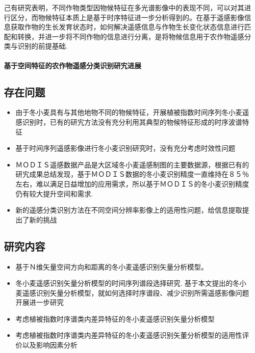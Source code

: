 己有研究表明，不同作物类型因物候特征在多光谱影像中的表现不同，可以对其进行区分，而物候特征本质上是基于时序特征进一步分析得到的。在基于遥感影像信息获取作物的生长发育状态时，如何解决遥感信息与作物生长变化状态信息进行匹配和转换，并进一步将不同作物的信息进行分离，是将物候信息用于农作物遥感分类与识别的前提基础.

\paragraph*{基于空间特征的农作物遥感分类识别研宄进展}


\subsection{存在问题}
\begin{itemize}
    \item 由于冬小麦具有与其他地物不同的物候特征，开展植被指数时间序列冬小麦遥感识别时，已有的研宄方法没有充分利用其典型的物候特征形成的时序波谱特征
    \item 基于时间序列遥感影像进行冬小麦识别研究时，没有充分考虑时效性问题
    \item ＭＯＤＩＳ遥感数据产品是大区域冬小麦遥感制图的主要数据源，根据已有的研宄成果总结发现，基于ＭＯＤＩＳ数据的冬小麦识别精度一直维持在８５％左右，难以满足日益增加的应用需求，所以基于ＭＯＤＩＳ的冬小麦识别精度仍有较大提升空间和需求.
    \item 新的遥感分类识别方法在不同空间分辨率影像上的适用性问题，给信息提取提出了新的挑战
\end{itemize}

\subsection{研究内容}

\begin{itemize}
    \item 基于Ｎ维矢量空间方向和距离的冬小麦遥感识别矢量分析模型。
    \item 冬小麦遥感识别矢量分析模型的时间序列谱段选择研究. 基于本文提出的冬小麦遥感识别矢量分析模型，就如何选择时序谱段、减少识别所需遥感影像问题开展进一步研究
    \item 考虑植被指数时序谱类内差异特征的冬小麦遥感识别矢量分析模型
    \item 考虑植被指数时序谱类内差异特征的冬小麦遥感识别矢董分析模型的适用性评价以及影响因素分析
\end{itemize}

















